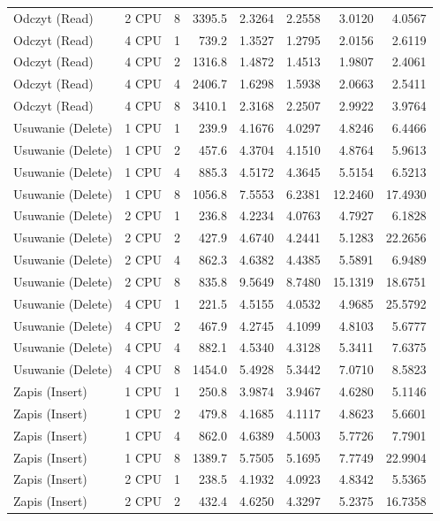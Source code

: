 \begin{table}[ht]
{\begin{tabular}{llcrrrrr}
Odczyt (Read) & 2 CPU & 8 & 3395.5 & 2.3264 & 2.2558 & 3.0120 & 4.0567 \\
Odczyt (Read) & 4 CPU & 1 & 739.2 & 1.3527 & 1.2795 & 2.0156 & 2.6119 \\
Odczyt (Read) & 4 CPU & 2 & 1316.8 & 1.4872 & 1.4513 & 1.9807 & 2.4061 \\
Odczyt (Read) & 4 CPU & 4 & 2406.7 & 1.6298 & 1.5938 & 2.0663 & 2.5411 \\
Odczyt (Read) & 4 CPU & 8 & 3410.1 & 2.3168 & 2.2507 & 2.9922 & 3.9764 \\
Usuwanie (Delete) & 1 CPU & 1 & 239.9 & 4.1676 & 4.0297 & 4.8246 & 6.4466 \\
Usuwanie (Delete) & 1 CPU & 2 & 457.6 & 4.3704 & 4.1510 & 4.8764 & 5.9613 \\
Usuwanie (Delete) & 1 CPU & 4 & 885.3 & 4.5172 & 4.3645 & 5.5154 & 6.5213 \\
Usuwanie (Delete) & 1 CPU & 8 & 1056.8 & 7.5553 & 6.2381 & 12.2460 & 17.4930 \\
Usuwanie (Delete) & 2 CPU & 1 & 236.8 & 4.2234 & 4.0763 & 4.7927 & 6.1828 \\
Usuwanie (Delete) & 2 CPU & 2 & 427.9 & 4.6740 & 4.2441 & 5.1283 & 22.2656 \\
Usuwanie (Delete) & 2 CPU & 4 & 862.3 & 4.6382 & 4.4385 & 5.5891 & 6.9489 \\
Usuwanie (Delete) & 2 CPU & 8 & 835.8 & 9.5649 & 8.7480 & 15.1319 & 18.6751 \\
Usuwanie (Delete) & 4 CPU & 1 & 221.5 & 4.5155 & 4.0532 & 4.9685 & 25.5792 \\
Usuwanie (Delete) & 4 CPU & 2 & 467.9 & 4.2745 & 4.1099 & 4.8103 & 5.6777 \\
Usuwanie (Delete) & 4 CPU & 4 & 882.1 & 4.5340 & 4.3128 & 5.3411 & 7.6375 \\
Usuwanie (Delete) & 4 CPU & 8 & 1454.0 & 5.4928 & 5.3442 & 7.0710 & 8.5823 \\
Zapis (Insert) & 1 CPU & 1 & 250.8 & 3.9874 & 3.9467 & 4.6280 & 5.1146 \\
Zapis (Insert) & 1 CPU & 2 & 479.8 & 4.1685 & 4.1117 & 4.8623 & 5.6601 \\
Zapis (Insert) & 1 CPU & 4 & 862.0 & 4.6389 & 4.5003 & 5.7726 & 7.7901 \\
Zapis (Insert) & 1 CPU & 8 & 1389.7 & 5.7505 & 5.1695 & 7.7749 & 22.9904 \\
Zapis (Insert) & 2 CPU & 1 & 238.5 & 4.1932 & 4.0923 & 4.8342 & 5.5365 \\
Zapis (Insert) & 2 CPU & 2 & 432.4 & 4.6250 & 4.3297 & 5.2375 & 16.7358 \\

\end{tabular}}
\end{table}
